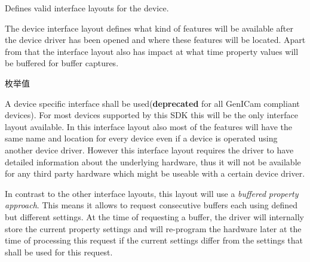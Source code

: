Defines valid interface layouts for the device. 

The device interface layout defines what kind of features will be available after the device driver has been opened and where these features will be located. Apart from that the interface layout also has impact at what time property values will be buffered for buffer captures. \begin{Desc}
\item[枚举值]\par
\begin{description}
\item[{\em 
\hypertarget{group___common_interface_gga8206c9f9a594b7c21b43aaa624a86220a1c2d04e0af3f97abd39f3e0dbc0a567d}{dil\+Device\+Specific}\label{group___common_interface_gga8206c9f9a594b7c21b43aaa624a86220a1c2d04e0af3f97abd39f3e0dbc0a567d}
}]A device specific interface shall be used({\bfseries deprecated} for all Gen\+I\+Cam compliant devices). For most devices supported by this S\+D\+K this will be the only interface layout available. In this interface layout also most of the features will have the same name and location for every device even if a device is operated using another device driver. However this interface layout requires the driver to have detailed information about the underlying hardware, thus it will not be available for any third party hardware which might be useable with a certain device driver.

In contrast to the other interface layouts, this layout will use a {\itshape buffered} {\itshape property} {\itshape approach}. This means it allows to request consecutive buffers each using defined but different settings. At the time of requesting a buffer, the driver will internally store the current property settings and will re-\/program the hardware later at the time of processing this request if the current settings differ from the settings that shall be used for this request.


\end{description}
\end{Desc}
